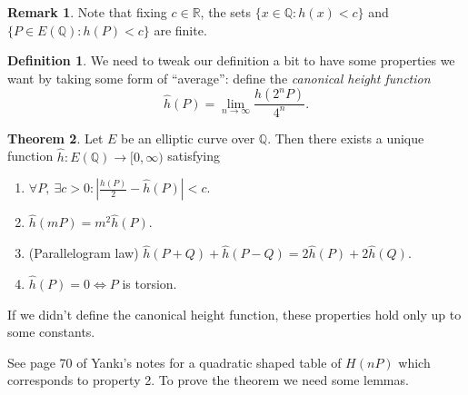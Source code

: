 \documentclass{article}
\newcommand{\Q}{\mathbb{Q}}
\newcommand{\R}{\mathbb{R}}
\theoremstyle{definition}
\newtheorem{defn}{Definition}[subsection]
\newtheorem{thm}[defn]{Theorem}
\newtheorem*{remark}{Remark}
\begin{document}
\begin{remark}
Note that fixing $c\in\R$, the sets $\{x\in\Q:h(x)<c\}$ and $\{P\in E(\Q):h(P)<c\}$ are finite.
\end{remark}

\begin{defn}
We need to tweak our definition a bit to have some properties we want by taking some form of ``average'': define the \textit{canonical height function}
\[
\widehat h(P)=\lim_{n\rightarrow\infty}\frac{h(2^nP)}{4^n}.
\]
\end{defn}

\begin{thm}
\label{thm:canonicalheight}
Let $E$ be an elliptic curve over $\Q$. Then there exists a unique function $\widehat h:E(\Q)\rightarrow[0,\infty)$ satisfying
\begin{enumerate}
\item $\forall P,\ \exists c>0:\left|\frac{h(P)}{2}-\widehat h(P)\right|<c$.
\item $\widehat h(mP)=m^2\widehat h(P)$.
\item (Parallelogram law) $\widehat h(P+Q)+\widehat h(P-Q)=2\widehat h(P)+2\widehat h(Q)$.
\item $\widehat h(P)=0\iff P$ is torsion.
\end{enumerate}

If we didn't define the canonical height function, these properties hold only up to some constants.
\end{thm}

See page 70 of Yankı's notes for a quadratic shaped table of $H(nP)$ which corresponds to property 2. To prove the theorem we need some lemmas.
\end{document}
